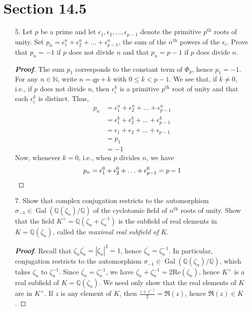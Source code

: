 \documentclass[12pt,leqno]{article}
\theoremstyle{definition}
\newcommand{\Gal}{\operatorname{Gal}}
\newcommand{\Q}{\mathbb{Q}}
\newcommand{\N}{\mathbb{N}}
\newcommand{\+}{\oplus}
\newenvironment{Proof}{\begin{proof}[\textnormal{\textbf{Proof}}]}{\end{proof}}
\begin{document}
\section*{Section 14.5}
  \begin{enumerate}
   \item [5.] Let $p$ be a prime and let $\epsilon_1,\epsilon_2,\hdots,\epsilon_{p-1}$ denote the primitive $p^{\text{th}}$ roots of unity. Set $p_n=\epsilon_1^n+\epsilon_2^n+\hdots+\epsilon_{p-1}^n$, the sum of the $n^{\text{th}}$ powers of the $\epsilon_i$. Prove that $p_n=-1$ if $p$ does not divide $n$ and that $p_n=p-1$ if $p$ does divide $n$.
    \begin{Proof}
     The sum $p_1$ corresponds to the constant term of $\varPhi_p$, hence $p_1=-1$. For any $n\in\N$, write $n=qp+k$ with $0\leq k<p-1$. We see that, if $k\not=0$, i.e., if $p$ does not divide $n$, then $\epsilon_i^k$ is a primitive $p^{\text{th}}$ root of unity and that each $\epsilon_i^k$ is distinct. Thus, \begin{align*}p_n&=\epsilon_1^n+\epsilon_2^n+\hdots+\epsilon_{p-1}^n\\&=\epsilon_1^k+\epsilon_2^k+\hdots+\epsilon_{p-1}^k\\&=\epsilon_1+\epsilon_2+\hdots+\epsilon_{p-1}\\&=p_1\\&=-1\end{align*} Now, whenever $k=0$, i.e., when $p$ divides $n$, we have \[p_n=\epsilon_1^0+\epsilon_2^0+\hdots+\epsilon_{p-1}^0=p-1\qedhere\]
    \end{Proof}
   \item [7.] Show that complex conjugation restricts to the automorphism $\sigma_{-1}\in\Gal(\Q(\zeta_n)/\Q)$ of the cyclotomic field of $n^{\text{th}}$ roots of unity. Show that the field $K^+=\Q(\zeta_n+\zeta_n^{-1})$ is the subfield of real elements in $K=\Q(\zeta_n)$, called the \textit{maximal real subfield of} $K$.
    \begin{Proof}
     Recall that $\zeta_n\overline{\zeta_n}=|\zeta_n|^2=1$, hence $\overline{\zeta_n}=\zeta_n^{-1}$. In particular, conjugation restricts to the automorphism $\sigma_{-1}\in\Gal(\Q(\zeta_n)/\Q)$, which takes $\zeta_n$ to $\zeta_n^{-1}$. Since $\overline{\zeta_n}=\zeta_n^{-1}$, we have $\zeta_n+\zeta_n^{-1}=2\text{Re}(\zeta_n)$, hence $K^+$ is a real subfield of $K=\Q(\zeta_n)$. We need only show that the real elements of $K$ are in $K^+$. If $z$ is any element of $K$, then $\frac{z+z^{-1}}{2}=\Re(z)$, hence $\Re(z)\in K$. 
    \end{Proof}
  \end{enumerate}
\end{document}
